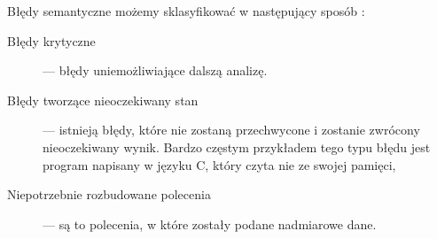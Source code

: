  Błędy semantyczne możemy sklasyfikować w następujący sposób \cite{link_semantic}:
\begin{description}
 \item[Błędy krytyczne] ---
    błędy uniemożliwiające dalszą analizę. 
 \item[Błędy tworzące nieoczekiwany stan] --- 
    istnieją błędy, które nie zostaną przechwycone i zostanie zwrócony nieoczekiwany wynik.
   Bardzo częstym przykładem tego typu błędu jest program napisany w języku C,
    który czyta nie ze swojej pamięci,
 \item[Niepotrzebnie rozbudowane polecenia] --- są to polecenia, w które zostały podane nadmiarowe dane.
\end{description}


\begin{comment} 
\end{comment}